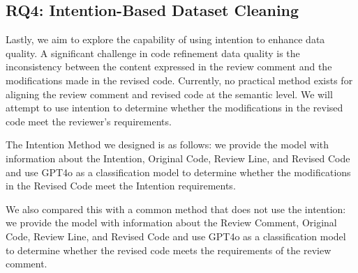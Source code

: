 

\subsection{RQ4: Intention-Based Dataset Cleaning}

Lastly, we aim to explore the capability of using intention to enhance data quality. A significant challenge in code refinement data quality is the inconsistency between the content expressed in the review comment and the modifications made in the revised code. Currently, no practical method exists for aligning the review comment and revised code at the semantic level. We will attempt to use intention to determine whether the modifications in the revised code meet the reviewer's requirements.

The Intention Method we designed is as follows: we provide the model with information about the Intention, Original Code, Review Line, and Revised Code and use GPT4o as a classification model to determine whether the modifications in the Revised Code meet the Intention requirements.

We also compared this with a common method that does not use the intention: we provide the model with information about the Review Comment, Original Code, Review Line, and Revised Code and use GPT4o as a classification model to determine whether the revised code meets the requirements of the review comment.


